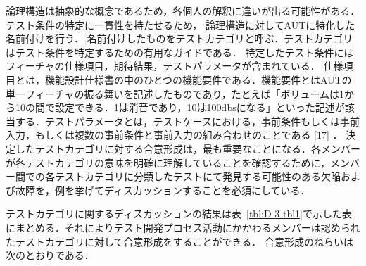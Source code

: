 \documentclass[a4paper,12pt]{jreport}
\begin{document}
 論理構造は抽象的な概念であるため，各個人の解釈に違いが出る可能性がある．テスト条件の特定に一貫性を持たせるため， 論理構造に対してAUTに特化した名前付けを行う．
名前付けしたものをテストカテゴリと呼ぶ．テストカテゴリはテスト条件を特定するための有用なガイドである．
特定したテスト条件にはフィーチャの仕様項目，期待結果，テストパラメータが含まれている．
仕様項目とは，機能設計仕様書の中のひとつの機能要件である．機能要件とはAUTの単一フィーチャの振る舞いを記述したものであり，たとえば「ボリュームは1から10の間で設定できる．1は消音であり，10は100dbsになる」といった記述が該当する．テストパラメータとは，テストケースにおける，事前条件もしくは事前入力，もしくは複数の事前条件と事前入力の組み合わせのことである [17] ．
      決定したテストカテゴリに対する合意形成は，最も重要なことになる．各メンバーが各テストカテゴリの意味を明確に理解していることを確認するために，メンバー間での各テストカテゴリに分類したテストにて発見する可能性のある欠陥および故障を，例を挙げてディスカッションすることを必須にしている．


テストカテゴリに関するディスカッションの結果は表~\ref{tbl:D-3-tbl1}で示した表にまとめる．それによりテスト開発プロセス活動にかかわるメンバーは認められたテストカテゴリに対して合意形成をすることができる． 合意形成のねらいは次のとおりである．
\end{document}

